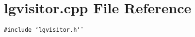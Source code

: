 \section{lgvisitor.cpp File Reference}
\label{lgvisitor_8cpp}
{\tt \#include \char`\"{}lgvisitor.h\char`\"{}}\par
